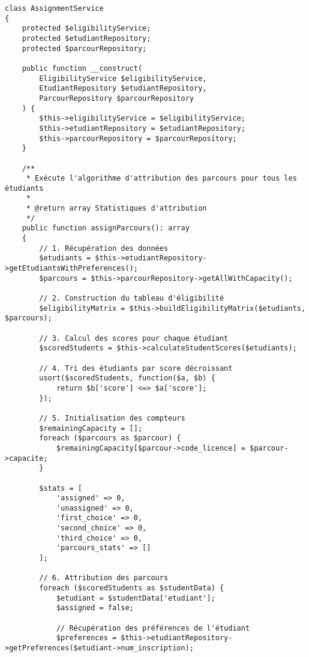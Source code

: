 \documentclass[french,12pt]{report} %
\begin{document}
\begin{lstlisting}[style=phpstyle,caption={AssignmentService - Algorithme d'attribution des parcours}]
class AssignmentService
{
    protected $eligibilityService;
    protected $etudiantRepository;
    protected $parcourRepository;
    
    public function __construct(
        EligibilityService $eligibilityService,
        EtudiantRepository $etudiantRepository,
        ParcourRepository $parcourRepository
    ) {
        $this->eligibilityService = $eligibilityService;
        $this->etudiantRepository = $etudiantRepository;
        $this->parcourRepository = $parcourRepository;
    }
    
    /**
     * Exécute l'algorithme d'attribution des parcours pour tous les étudiants
     * 
     * @return array Statistiques d'attribution
     */
    public function assignParcours(): array
    {
        // 1. Récupération des données
        $etudiants = $this->etudiantRepository->getEtudiantsWithPreferences();
        $parcours = $this->parcourRepository->getAllWithCapacity();
        
        // 2. Construction du tableau d'éligibilité
        $eligibilityMatrix = $this->buildEligibilityMatrix($etudiants, $parcours);
        
        // 3. Calcul des scores pour chaque étudiant
        $scoredStudents = $this->calculateStudentScores($etudiants);
        
        // 4. Tri des étudiants par score décroissant
        usort($scoredStudents, function($a, $b) {
            return $b['score'] <=> $a['score'];
        });
        
        // 5. Initialisation des compteurs
        $remainingCapacity = [];
        foreach ($parcours as $parcour) {
            $remainingCapacity[$parcour->code_licence] = $parcour->capacite;
        }
        
        $stats = [
            'assigned' => 0,
            'unassigned' => 0,
            'first_choice' => 0,
            'second_choice' => 0,
            'third_choice' => 0,
            'parcours_stats' => []
        ];
        
        // 6. Attribution des parcours
        foreach ($scoredStudents as $studentData) {
            $etudiant = $studentData['etudiant'];
            $assigned = false;
            
            // Récupération des préférences de l'étudiant
            $preferences = $this->etudiantRepository->getPreferences($etudiant->num_inscription);
            

\end{lstlisting}
\end{document}
